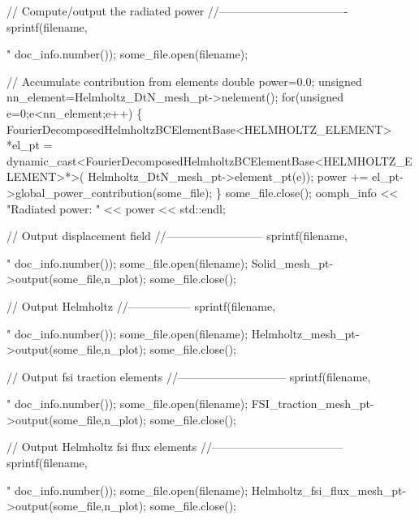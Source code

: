 \begin{DoxyCodeInclude}
 \textcolor{comment}{// Compute/output the radiated power}
 \textcolor{comment}{//----------------------------------}
 sprintf(filename,\textcolor{stringliteral}{"%
         doc\_info.number());
 some\_file.open(filename);

 \textcolor{comment}{// Accumulate contribution from elements}
 \textcolor{keywordtype}{double} power=0.0;
 \textcolor{keywordtype}{unsigned} nn\_element=Helmholtz\_DtN\_mesh\_pt->nelement(); 
 \textcolor{keywordflow}{for}(\textcolor{keywordtype}{unsigned} e=0;e<nn\_element;e++)
  \{
   FourierDecomposedHelmholtzBCElementBase<HELMHOLTZ\_ELEMENT> *el\_pt = 
    \textcolor{keyword}{dynamic\_cast<}FourierDecomposedHelmholtzBCElementBase<HELMHOLTZ\_ELEMENT>*\textcolor{keyword}{>}(
     Helmholtz\_DtN\_mesh\_pt->element\_pt(e)); 
   power += el\_pt->global\_power\_contribution(some\_file);
  \}
 some\_file.close();
 oomph\_info << \textcolor{stringliteral}{"Radiated power: "} << power << std::endl;

 \textcolor{comment}{// Output displacement field}
 \textcolor{comment}{//--------------------------}
 sprintf(filename,\textcolor{stringliteral}{"%
         doc\_info.number());
 some\_file.open(filename);
 Solid\_mesh\_pt->output(some\_file,n\_plot);
 some\_file.close();

 \textcolor{comment}{// Output Helmholtz}
 \textcolor{comment}{//-----------------}
 sprintf(filename,\textcolor{stringliteral}{"%
         doc\_info.number());
 some\_file.open(filename);
 Helmholtz\_mesh\_pt->output(some\_file,n\_plot);
 some\_file.close();


 \textcolor{comment}{// Output fsi traction elements}
 \textcolor{comment}{//----------------------------- }
 sprintf(filename,\textcolor{stringliteral}{"%
         doc\_info.number());
 some\_file.open(filename);
 FSI\_traction\_mesh\_pt->output(some\_file,n\_plot);
 some\_file.close();


 \textcolor{comment}{// Output Helmholtz fsi flux elements}
 \textcolor{comment}{//----------------------------------- }
 sprintf(filename,\textcolor{stringliteral}{"%
         doc\_info.number());
 some\_file.open(filename);
 Helmholtz\_fsi\_flux\_mesh\_pt->output(some\_file,n\_plot);
 some\_file.close();

}}}}}
\end{DoxyCodeInclude}

